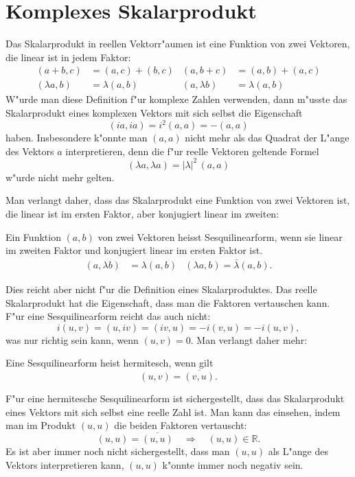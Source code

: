 \section{Komplexes Skalarprodukt}
Das Skalarprodukt in reellen Vektorr"aumen ist eine Funktion von
zwei Vektoren, die linear ist in jedem Faktor:
\begin{align*}
(a+b,c)&=(a,c)+(b,c)&(a,b+c)&=(a,b)+(a,c)\\
(\lambda a,b)&=\lambda(a,b)&(a,\lambda b)&=\lambda(a,b)
\end{align*}
W"urde man diese Definition f"ur komplexe Zahlen verwenden, dann
m"usste das Skalarprodukt eines komplexen Vektors mit sich selbst
die Eigenschaft 
\[
(ia,ia)=i^2(a,a)=-(a,a)
\]
haben. Insbesondere k"onnte man $(a,a)$ nicht mehr als das Quadrat der
L"ange des Vektors $a$ interpretieren, denn die f"ur reelle Vektoren
geltende Formel
\[
(\lambda a,\lambda a)=|\lambda |^2\, (a,a)
\]
w"urde nicht mehr gelten.

Man verlangt daher, dass das Skalarprodukt eine Funktion von zwei Vektoren
ist, die linear ist im ersten Faktor, aber konjugiert linear im zweiten:
\begin{definition}
Ein Funktion $(a,b)$ von zwei Vektoren heisst Sesquilinearform, wenn
sie linear im zweiten Faktor und konjugiert linear im ersten Faktor ist.
\begin{align*}
(a,\lambda b)&=\lambda (a,b)&(\lambda a,b)=\bar\lambda (a,b).
\end{align*}
\end{definition}
Dies reicht aber nicht f"ur die Definition eines Skalarproduktes.
Das reelle Skalarprodukt hat die Eigenschaft, dass man die Faktoren
vertauschen kann. F"ur eine Sesquilinearform reicht das auch nicht:
\[
i(u,v)=(u,iv)=(iv,u)=-i(v,u)=-i(u,v),
\]
was nur richtig sein kann, wenn $(u,v)=0$. Man verlangt daher mehr:

\begin{definition}
Eine Sesquilinearform heist hermitesch, wenn gilt
\[
(u,v)=\overline{(v,u)}.
\]
\end{definition}
F"ur eine hermitesche Sesquilinearform ist sichergestellt, dass
das Skalarprodukt eines Vektors mit sich selbst eine reelle Zahl
ist. Man kann das einsehen, indem man im Produkt $(u,u)$ die beiden
Faktoren vertauscht:
\[
(u,u)=\overline{(u,u)}\quad\Rightarrow\quad (u,u)\in\mathbb R.
\]
Es ist aber immer noch nicht sichergestellt, dass man $(u,u)$ als
L"ange des Vektors interpretieren kann, $(u,u)$ k"onnte immer noch
negativ sein. 

